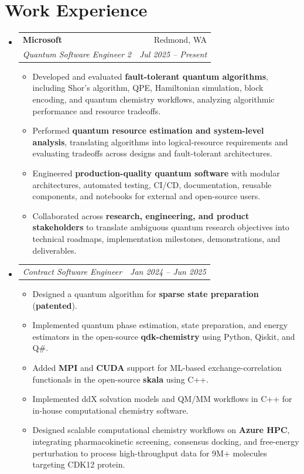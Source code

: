 \documentclass[11pt, letterpaper]{article}
\makeatletter
\newcommand{\resumeSubheading}[4]{
  \vspace{2pt}\item
    \begin{tabular*}{1.0\textwidth}[t]{l@{\extracolsep{\fill}}r}
      \textbf{#1} & #2 \\
      \textit{\small#3} & \textit{\small #4} \\
    \end{tabular*}\vspace{-6pt}
}
\newcommand{\resumeSubSubheading}[2]{
    \item
    \begin{tabular*}{1.0\textwidth}{l@{\extracolsep{\fill}}r}
      \textit{\small#1} & \textit{\small #2} \\
    \end{tabular*}\vspace{-6pt}
}
\newcommand{\resumeItemListStart}{\begin{itemize}[leftmargin=0.15in, label={--}, itemsep=-2pt]}
\newcommand{\resumeItemListEnd}{\end{itemize}\vspace{-6pt}}
\newcommand{\resumeItem}[1]{\item\small{#1}}
\makeatother
\begin{document}
\section{Work Experience}
\begin{itemize}[leftmargin=0in, label={}, itemsep=0pt]

    \resumeSubheading
    {Microsoft}{Redmond, WA} 
    {Quantum Software Engineer 2}{Jul 2025 -- Present}
    \resumeItemListStart
    \resumeItem{Developed and evaluated \textbf{fault-tolerant quantum algorithms}, including Shor's algorithm, QPE, Hamiltonian simulation, block encoding, and quantum chemistry workflows, analyzing algorithmic performance and resource tradeoffs.}
    \resumeItem{Performed \textbf{quantum resource estimation and system-level analysis}, translating algorithms into logical-resource requirements and evaluating tradeoffs across designs and fault-tolerant architectures.}
    \resumeItem{Engineered \textbf{production-quality quantum software} with modular architectures, automated testing, CI/CD, documentation, reusable components, and notebooks for external and open-source users.}
    \resumeItem{Collaborated across \textbf{research, engineering, and product stakeholders} to translate ambiguous quantum research objectives into technical roadmaps, implementation milestones, demonstrations, and deliverables.}
    \resumeItemListEnd

    \resumeSubSubheading
      {Contract Software Engineer}{Jan 2024 -- Jun 2025}
      \resumeItemListStart
      \resumeItem{Designed a quantum algorithm for \textbf{sparse state preparation} (\textbf{patented}).}
      \resumeItem{Implemented quantum phase estimation, state preparation, and energy estimators in the open-source \textbf{qdk-chemistry} using Python, Qiskit, and Q\#.}
      \resumeItem{Added \textbf{MPI} and \textbf{CUDA} support for ML-based exchange-correlation functionals in the open-source \textbf{skala} using C++.}
      \resumeItem{Implemented ddX solvation models and QM/MM workflows in C++ for in-house computational chemistry software.}
      \resumeItem{Designed scalable computational chemistry workflows on \textbf{Azure HPC}, integrating pharmacokinetic screening, consensus docking, and free-energy perturbation to process high-throughput data for 9M+ molecules targeting CDK12 protein.}
      \resumeItemListEnd

\end{itemize}

\end{document}
